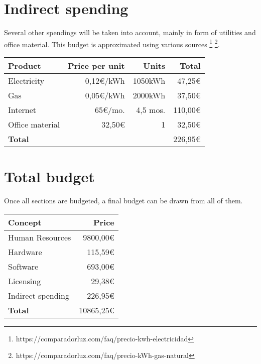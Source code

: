\section{Indirect spending}

Several other spendings will be taken into account, mainly in form of utilities and office material. This budget is approximated using various sources
\footnote{https://comparadorluz.com/faq/precio-kwh-electricidad}
\footnote{https://comparadorluz.com/faq/precio-kWh-gas-natural}.

\begin{center}
    \begin{tabular}{ | l | r | r | r | }
        \hline
        \textbf{Product} & \textbf{Price per unit} &
        \textbf{Units} & \textbf{Total} \\ 
        \hline
        \hline
        Electricity & 0,12€/kWh & 1050kWh & 47,25€ \\  
        Gas & 0,05€/kWh & 2000kWh & 37,50€ \\  
        Internet & 65€/mo. & 4,5 mos. & 110,00€ \\  
        Office material & 32,50€ & 1 & 32,50€ \\  
        \hline
        \textbf{Total} & & & 226,95€ \\      
        \hline
    \end{tabular}
\end{center}

\section{Total budget}

Once all sections are budgeted, a final budget can be drawn from all of them.

\begin{center}
    \begin{tabular}{ | l | r | }
        \hline
        \textbf{Concept} & \textbf{Price} \\
        \hline
        \hline
        Human Resources & 9800,00€ \\  
        Hardware & 115,59€ \\  
        Software & 693,00€ \\  
        Licensing & 29,38€ \\
        Indirect spending & 226,95€ \\
        \hline
        \textbf{Total} & 10865,25€ \\      
        \hline
    \end{tabular}
\end{center}

